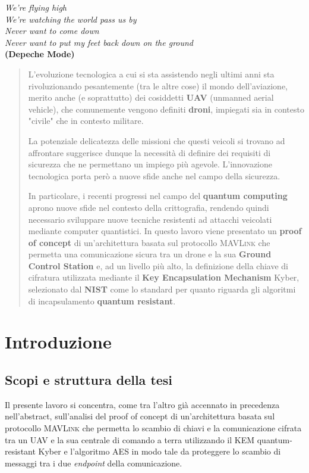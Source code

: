 \documentclass[a4paper, 12pt, oneside]{article}
\theoremstyle{definition}
\begin{document}
\begin{titlepage}
\nonumber
\null {}
    \begin{flushright}
        \textit{We're flying high \\
        We're watching the world pass us by\\
        Never want to come down\\
        Never want to put my feet back down on the ground} \\
        \textbf{(Depeche Mode)}
    \end{flushright}
\end{titlepage}
    
\newpage
\tableofcontents
\newpage

\begin{abstract}
    L'evoluzione tecnologica a cui si sta assistendo negli ultimi anni sta rivoluzionando pesantemente (tra le altre cose) il mondo dell'aviazione, merito anche (e soprattutto) dei cosiddetti \textbf{UAV} (unmanned aerial vehicle), che comunemente vengono definiti \textbf{droni}, impiegati sia in contesto "civile" che in contesto militare. 
    
    La potenziale delicatezza delle missioni che questi veicoli si trovano ad affrontare suggerisce dunque la necessità di definire dei requisiti di sicurezza che ne permettano un impiego più agevole. L'innovazione tecnologica porta però a nuove sfide anche nel campo della sicurezza. 
    
    In particolare, i recenti progressi nel campo del \textbf{quantum computing} aprono nuove sfide nel contesto della crittografia, rendendo quindi necessario sviluppare nuove tecniche resistenti ad attacchi veicolati mediante computer quantistici. In questo lavoro viene presentato un \textbf{proof of concept} di un'architettura basata sul protocollo \textsc{MAVLink} che permetta una comunicazione sicura tra un drone e la sua \textbf{Ground Control Station} e, ad un livello più alto, la definizione della chiave di cifratura utilizzata mediante il \textbf{Key Encapsulation Mechanism} Kyber, selezionato dal \textbf{NIST} come lo standard per quanto riguarda gli algoritmi di incapsulamento \textbf{quantum resistant}.
\end{abstract}
\newpage

\section{Introduzione}

\subsection{Scopi e struttura della tesi}
Il presente lavoro si concentra, come tra l'altro già accennato in precedenza nell'abstract, sull'analisi del proof of concept di un'architettura basata sul protocollo \textsc{MAVLink} che permetta lo scambio di chiavi e la comunicazione cifrata tra un UAV e la sua centrale di comando a terra utilizzando il KEM quantum-resistant Kyber e l'algoritmo AES in modo tale da proteggere lo scambio di messaggi tra i due \textit{endpoint} della comunicazione.
\end{document}
